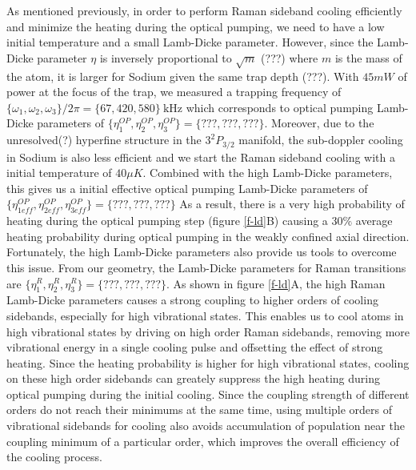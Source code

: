\documentclass[aps,prl,twocolumn,groupedaddress]{revtex4-1}
\begin{document}
As mentioned previously, in order to perform Raman sideband cooling efficiently and
minimize the heating during the optical pumping, we need to have a low initial temperature and
a small Lamb-Dicke parameter. However, since the Lamb-Dicke parameter $\eta$ is inversely
proportional to $\sqrt{m}$ (???) where $m$ is the mass of the atom, it is larger for Sodium
given the same trap depth (???). With $45mW$ of power at the focus of the trap,
we measured a trapping frequency of $\{\omega_1,\omega_2,\omega_3\}/2\pi = \{67, 420, 580\}\ \text{kHz}$
which corresponds to optical pumping Lamb-Dicke parameters of
$\{\eta^{OP}_1,\eta^{OP}_2,\eta^{OP}_3\} = \{???, ???, ???\}$.
Moreover, due to the unresolved(?) hyperfine structure in the $3^2P_{3/2}$ manifold,
the sub-doppler cooling in Sodium is also less efficient and we start the
Raman sideband cooling with a initial temperature of $40\mu K$. Combined with the high Lamb-Dicke
parameters, this gives us a initial effective optical pumping Lamb-Dicke parameters of
$\{\eta^{OP}_{1eff},\eta^{OP}_{2eff},\eta^{OP}_{3eff}\} = \{???, ???, ???\}$
As a result, there is a very high probability of heating during the optical pumping step
(figure \ref{f-ld}B) causing a $30\%$ average heating probability during optical pumping
in the weakly confined axial direction. Fortunately, the high Lamb-Dicke parameters also
provide us tools to overcome this issue. From our geometry, the Lamb-Dicke parameters for
Raman transitions are $\{\eta^R_{1},\eta^R_{2},\eta^R_{3}\} = \{???, ???, ???\}$. As shown in
figure \ref{f-ld}A, the high Raman Lamb-Dicke parameters causes a strong coupling to higher orders
of cooling sidebands, especially for high vibrational states.
This enables us to cool atoms in high vibrational states by driving on high order Raman sidebands,
removing more vibrational energy in a single cooling pulse and offsetting the effect of
strong heating. Since the heating probability is higher for high vibrational states,
cooling on these high order sidebands can greately suppress the high heating during
optical pumping during the initial cooling. Since the coupling strength of different orders
do not reach their minimums at the same time, using multiple orders of vibrational sidebands
for cooling also avoids accumulation of population near the coupling minimum of a particular
order, which improves the overall efficiency of the cooling process.
\end{document}
